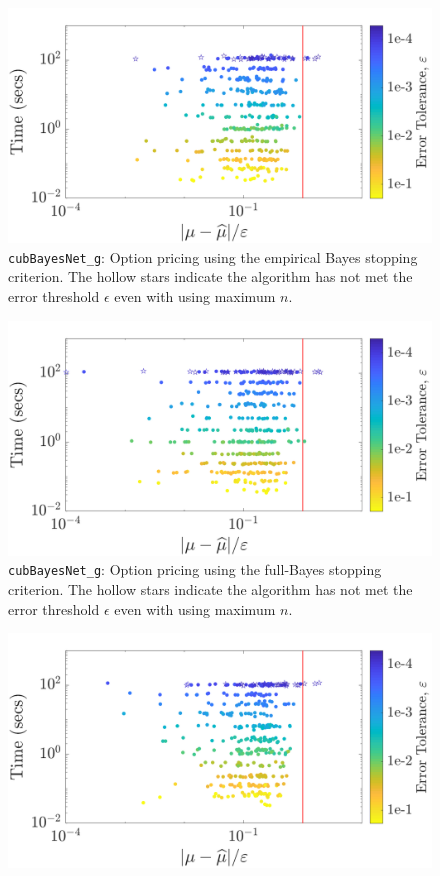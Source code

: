 \documentclass{iitthesis}          %
\newcommand{\code}[1]{\texttt{#1}}
\begin{document}
{{{{{{\begin{figure}
	\centering
	\includegraphics[width=0.95\linewidth]{"Sobol/Sobol_optPrice_guaranteed_time_MLE__d12_r1_2019-Sep-1"}
	\caption[Sobol: Option pricing guaranteed: MLE]{\code{cubBayesNet\_g}: Option pricing using the empirical Bayes stopping criterion. The hollow stars indicate the algorithm has not met the error threshold $\epsilon$ even with using maximum $n$.}
	\label{fig:Sobol-optprice-guaranteed-MLE}
\end{figure}
\begin{figure}
	\centering
	\includegraphics[width=0.95\linewidth]{"Sobol/Sobol_optPrice_guaranteed_time_full__d12_r1_2019-Sep-1"}
	\caption[Sobol: Option pricing guaranteed: Full Bayes]{\code{cubBayesNet\_g}: Option pricing using the full-Bayes stopping criterion. The hollow stars indicate the algorithm has not met the error threshold $\epsilon$ even with using maximum $n$.}
	\label{fig:Sobol-optprice-guaranteed-FB}
\end{figure}
\begin{figure}
	\centering
	\includegraphics[width=0.95\linewidth]{"Sobol/Sobol_optPrice_guaranteed_time_GCV__d12_r1_2019-Sep-1"}

\end{figure}}}}}}}
\end{document}
